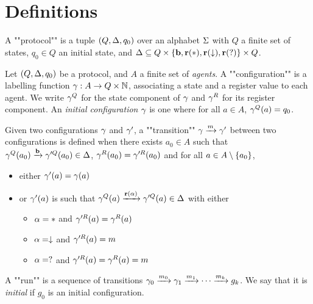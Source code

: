 \section{Definitions}

\begin{definition}
	A ""protocol"" is a tuple $(Q, \D, q_0)$ over an alphabet $\S$ with $Q$ a finite set of states, $q_0 \in Q$ an initial state, and $\D \subseteq Q \times \set{\br, \rec(*), \rec(\cp), \rec(\testeq)} \times Q$.
\end{definition}

\begin{definition}
	Let $(Q,\D, q_0)$ be a protocol, and $A$ a finite set of \emph{agents}.
	A ""configuration"" is a labelling function $\g : A \to Q \times \nats$, associating a state and a register value to each agent. We write $\g^Q$ for the state component of $\g$ and $\g^R$ for its register component.
	An \emph{initial configuration} $\g$ is one where for all $a \in A$, $\g^Q(a) = q_0$.
	
	\AP Given two configurations $\g$ and $\g'$, a ""transition"" $\g 
	\act{m} \g'$ between two configurations is defined when there exists $a_0 \in A$ such that $\g^Q(a_0) \act{\br} \g'^Q(a_0) \in \D$, $\g^R(a_0) = \g'^R(a_0)$ and for all $a \in A\setminus \set{a_0}$,  
	\begin{itemize}
		\item either $\g'(a) = \g(a)$
		
		\item or $\g'(a)$ is such that $\g^Q(a) \act{\rec(\a)} \g'^Q(a) \in \D$ with either
		\begin{itemize}
			\item $\a = *$ and $\g'^R(a) = \g^{R}(a)$
			\item $\a = \cp$ and $\g'^R(a) = m$
			\item $\a = \testeq$ and $\g'^R(a) = \g^R(a) =m$
		\end{itemize}
	\end{itemize}

	\AP A ""run"" is a sequence of transitions $\g_0 \act{m_0} \g_1 \act{m_1} \cdots \act{m_k} g_k$. We say that it is \emph{initial} if $g_0$ is an initial configuration.
\end{definition}

